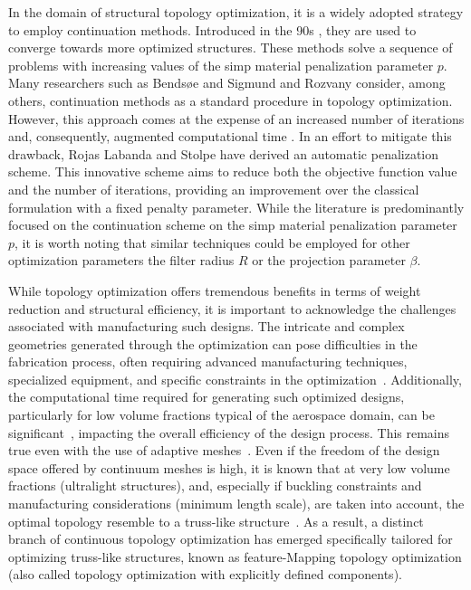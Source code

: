 In the domain of structural topology optimization, it is a widely adopted strategy to employ continuation methods. Introduced in the 90s , they are used to converge towards more optimized structures. These methods solve a sequence of problems with increasing values of the \gls{simp} material penalization parameter $p$. Many researchers such as Bendsøe and Sigmund  and Rozvany  consider, among others, continuation methods as a standard procedure in topology optimization. However, this approach comes at the expense of an increased number of iterations and, consequently, augmented computational time . In an effort to mitigate this drawback, Rojas Labanda and Stolpe  have derived an automatic penalization scheme. This innovative scheme aims to reduce both the objective function value and the number of iterations, providing an improvement over the classical formulation with a fixed penalty parameter. While the literature is predominantly focused on the continuation scheme on the \gls{simp} material penalization parameter $p$, it is worth noting that similar techniques could be employed for other optimization parameters \eg the filter radius $R$ or the projection parameter $\beta$.

While topology optimization offers tremendous benefits in terms of weight reduction and structural efficiency, it is important to acknowledge the challenges associated with manufacturing such designs. The intricate and complex geometries generated through the optimization can pose difficulties in the fabrication process, often requiring advanced manufacturing techniques, specialized equipment, and specific constraints in the optimization~. Additionally, the computational time required for generating such optimized designs, particularly for low volume fractions typical of the aerospace domain, can be significant~, impacting the overall efficiency of the design process. This remains true even with the use of adaptive meshes~. Even if the freedom of the design space offered by continuum meshes is high, it is known that at very low volume fractions (\eg ultralight structures), and, especially if buckling constraints and manufacturing considerations (\eg minimum length scale), are taken into account, the optimal topology resemble to a truss-like structure~. As a result, a distinct branch of continuous topology optimization has emerged specifically tailored for optimizing truss-like structures, known as feature-Mapping topology optimization (also called topology optimization with explicitly defined components).

